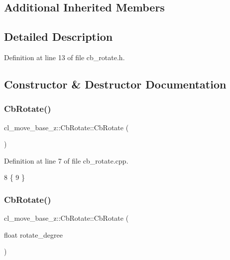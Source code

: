 \subsection*{Additional Inherited Members}


\subsection{Detailed Description}


Definition at line 13 of file cb\+\_\+rotate.\+h.



\subsection{Constructor \& Destructor Documentation}
\mbox{\label{classcl__move__base__z_1_1CbRotate_a00dc68fbc8e72461f338de1cbdfceffd}} 
\subsubsection{\texorpdfstring{Cb\+Rotate()}{CbRotate()}\hspace{0.1cm}{\footnotesize\ttfamily [1/2]}}
{\footnotesize\ttfamily cl\+\_\+move\+\_\+base\+\_\+z\+::\+Cb\+Rotate\+::\+Cb\+Rotate (\begin{DoxyParamCaption}{ }\end{DoxyParamCaption})}



Definition at line 7 of file cb\+\_\+rotate.\+cpp.


\begin{DoxyCode}
8 \{
9 \}
\end{DoxyCode}
\mbox{\label{classcl__move__base__z_1_1CbRotate_ac5b1f8c358d719d2cdc8417f65143ad8}} 
\subsubsection{\texorpdfstring{Cb\+Rotate()}{CbRotate()}\hspace{0.1cm}{\footnotesize\ttfamily [2/2]}}
{\footnotesize\ttfamily cl\+\_\+move\+\_\+base\+\_\+z\+::\+Cb\+Rotate\+::\+Cb\+Rotate (\begin{DoxyParamCaption}\item[{float}]{rotate\+\_\+degree }\end{DoxyParamCaption})}



